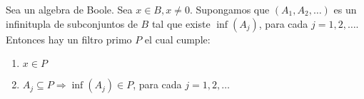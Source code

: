 \begin{theorem}
  Sea \algBoole un algebra de Boole. Sea $x \in B, x \neq 0$. Supongamos que $(A_1, A_2, \dots)$ es un infinitupla 
  de subconjuntos de $B$ tal que existe $\inf(A_j)$, para cada $j = 1, 2, \dots$. Entonces hay un filtro primo $P$ 
  el cual cumple:
  \begin{enumerate}
    \item $x \in P$
    \item $A_j \subseteq P \Rightarrow \inf(A_j) \in P$, para cada $j = 1, 2, \dots$
  \end{enumerate}
\end{theorem}
\noproof